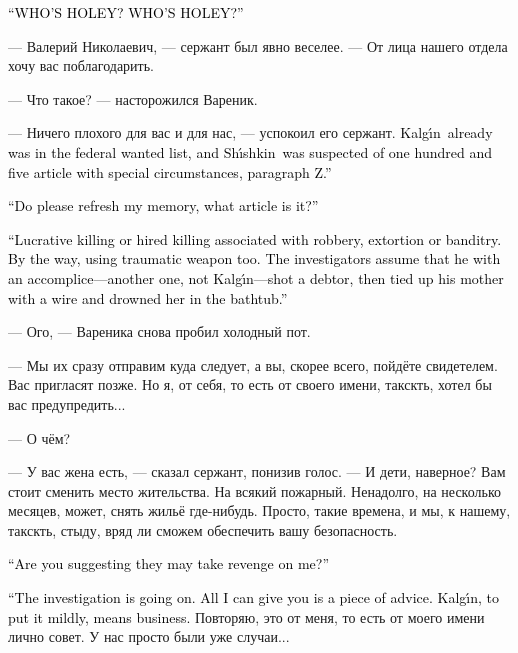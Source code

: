 \documentclass[a5paper,12pt,fleqn]{extbook}\usepackage{cooltooltips}\usepackage{polyglossia}\setdefaultlanguage[babelshorthands=true]{russian}\setotherlanguage{english}\defaultfontfeatures{Ligatures=TeX,Mapping=tex-text} \usepackage{xcolor}\definecolor{lightgray}{HTML}{bbbbbb}\color{lightgray}\newcommand{\ml}[3]{\textenglish{\textcolor{black}{#3}}}
\newcommand{\asterism}{\vspace{1em}{\centering\Large\bfseries$\ast~\ast~\ast$\par}\vspace{1em}}
\newcommand{\textspace}{\vspace{1em}{\centering\Large\bfseries<...>\par}\vspace{1em}}
\newcommand{\Kalgin}{Kalg\'{\i}n}
\newcommand{\Shishkin}{Sh\'{\i}shkin}
\begin{document}
\ml{$0$}
{--- КТО ДЫРЯВЫЙ?}
{``WHO'S HOLEY?}
\ml{$0$}
{КТО ДЫРЯВЫЙ?}
{WHO'S HOLEY?''}

\asterism

\textspace

--- Валерий Николаевич, --- сержант был явно веселее.
--- От лица нашего отдела хочу вас поблагодарить.

--- Что такое? --- насторожился Вареник.

--- Ничего плохого для вас и для нас, --- успокоил его сержант.
\ml{$0$}
{--- Калгин уже был в федеральном розыске, а Шишкин проходил подозреваемым по сто пятой с отягчающими, пункт <<З>>.}
{\Kalgin\ already was in the federal wanted list, and \Shishkin\ was suspected of one hundred and five article with special circumstances, paragraph Z.''}

\ml{$0$}
{--- Напомните, что это за статья?}
{``Do please refresh my memory, what article is it?''}

\ml{$0$}
{--- Убийство из корыстных побуждений, а равно сопряженное с разбоем, вымогательством или бандитизмом.}
{``Lucrative killing or hired killing associated with robbery, extortion or banditry.}
\ml{$0$}
{Кстати, тоже с использованием травматического оружия.}
{By the way, using traumatic weapon too.}
\ml{$0$}
{Предположительно он с подельником --- другим, не Калгиным --- застрелил должника, а его мать связал проводами и утопил в ванной.}
{The investigators assume that he with an accomplice---another one, not \Kalgin---shot a debtor, then tied up his mother with a wire and drowned her in the bathtub.''}

--- Ого, --- Вареника снова пробил холодный пот.

--- Мы их сразу отправим куда следует, а вы, скорее всего, пойдёте свидетелем.
Вас пригласят позже.
Но я, от себя, то есть от своего имени, такскть, хотел бы вас предупредить...

--- О чём?

--- У вас жена есть, --- сказал сержант, понизив голос.
--- И дети, наверное?
Вам стоит сменить место жительства.
На всякий пожарный.
Ненадолго, на несколько месяцев, может, снять жильё где-нибудь.
Просто, такие времена, и мы, к нашему, такскть, стыду, вряд ли сможем обеспечить вашу безопасность.

\ml{$0$}
{--- Вы думаете, что мне могут отомстить?}
{``Are you suggesting they may take revenge on me?''}

\ml{$0$}
{--- Следствие в процессе.}
{``The investigation is going on.}
\ml{$0$}
{Пока могу лишь дать вам совет.}
{All I can give you is a piece of advice.}
\ml{$0$}
{Калгин, скажем так, настроен серьёзно.}
{\Kalgin, to put it mildly, means business.}
Повторяю, это от меня, то есть от моего имени лично совет.
У нас просто были уже случаи...
\end{document}
